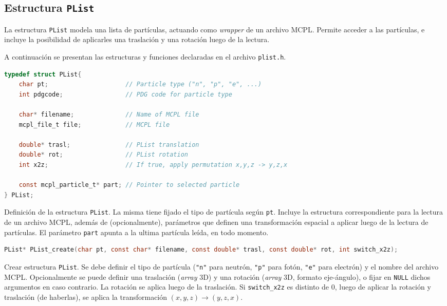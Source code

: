\subsection{Estructura \texttt{PList}}

La estructura \verb|PList| modela una lista de partículas, actuando como \emph{wrapper} de un archivo MCPL. Permite acceder a las partículas, e incluye la posibilidad de aplicarles una traslación y una rotación luego de la lectura.

A continuación se presentan las estructuras y funciones declaradas en el archivo \verb|plist.h|.

\begin{footnotesize}

\begin{lstlisting}[language=C]
typedef struct PList{
	char pt;                     // Particle type ("n", "p", "e", ...)
	int pdgcode;                 // PDG code for particle type

	char* filename;              // Name of MCPL file
	mcpl_file_t file;            // MCPL file

	double* trasl;               // PList translation
	double* rot;                 // PList rotation
	int x2z;                     // If true, apply permutation x,y,z -> y,z,x

	const mcpl_particle_t* part; // Pointer to selected particle
} PList;
\end{lstlisting}
\begin{addmargin}[0.5cm]{0cm}
Definición de la estructura \verb|PList|. La misma tiene fijado el tipo de partícula según \verb|pt|. Incluye la estructura correspondiente para la lectura de un archivo MCPL, además de (opcionalmente), parámetros que definen una transformación espacial a aplicar luego de la lectura de partículas. El parámetro \verb|part| apunta a la ultima partícula leída, en todo momento.
\end{addmargin}

\begin{lstlisting}[language=C]
PList* PList_create(char pt, const char* filename, const double* trasl, const double* rot, int switch_x2z);
\end{lstlisting}
\begin{addmargin}[0.5cm]{0cm}
Crear estructura \verb|PList|. Se debe definir el tipo de partícula (\verb|"n"| para neutrón, \verb|"p"| para fotón, \verb|"e"| para electrón) y el nombre del archivo MCPL. Opcionalmente se puede definir una traslación (\emph{array} 3D) y una rotación (\emph{array} 3D, formato eje-ángulo), o fijar en \verb|NULL| dichos argumentos en caso contrario. La rotación se aplica luego de la traslación. Si \verb|switch_x2z| es distinto de 0, luego de aplicar la rotación y traslación (de haberlas), se aplica la transformación $(x,y,z)\rightarrow (y,z,x)$.
\end{addmargin}


\end{footnotesize}
